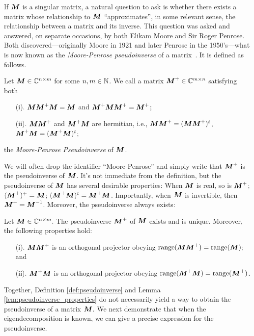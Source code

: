 If ${\vb*{M}}$ is a singular matrix, a natural question to ask is whether there exists a matrix whose relationship to ${\vb*{M}}$ ``approximates'', in some relevant sense, the relationship between a matrix and its inverse. This question  was asked and answered, on separate occasions, by both Elikam Moore and Sir Roger Penrose. Both discovered---originally Moore in 1921 and later Penrose in the 1950's---what is now known as the \emph{Moore-Penrose pseudoinverse} of a matrix~\cite{moore1920reciprocal, penrose1955generalized,penrose1956best}. It is defined as follows. 

\begin{definition}
\label{def:pseudoinverse}
Let ${\vb*{M}}\in\mathbb{C}^{n\times m}$ for some $n,m\in\mathbb{N}$. We call a matrix ${\vb*{M}}^+\in\mathbb{C}^{m\times n}$ satisfying both
\begin{enumerate}
    \item[(i).] ${\vb*{M}}{\vb*{M}}^+{\vb*{M}}={\vb*{M}}$ and ${\vb*{M}}^+{\vb*{M}}{\vb*{M}}^+={\vb*{M}}^+$;
    \item[(ii).] ${\vb*{M}}{\vb*{M}}^+$ and ${\vb*{M}}^+{\vb*{M}}$ are hermitian, i.e., ${\vb*{M}}{\vb*{M}}^+=({\vb*{M}}{\vb*{M}}^+)^t $, ${\vb*{M}}^+{\vb*{M}}=({\vb*{M}}^+{\vb*{M}})^t$; 
\end{enumerate}
the \emph{Moore-Penrose Pseudoinverse} of ${\vb*{M}}$. 
\end{definition}

We will often drop the identifier ``Moore-Penrose'' and simply write that ${\vb*{M}}^+$ is the pseudoinverse of ${\vb*{M}}$. It's not immediate from  the definition, but the pseudoinverse of ${\vb*{M}}$ has several desirable properties: When ${\vb*{M}}$ is real, so is ${\vb*{M}}^+$; $({\vb*{M}}^+)^+={\vb*{M}}$; $({\vb*{M}}^+{\vb*{M}})^t = {\vb*{M}}^+{\vb*{M}}$. Importantly, when ${\vb*{M}}$ is invertible, then ${\vb*{M}}^+={\vb*{M}}^{-1}$. Moreover, the pseudoinverse always exists: 

\begin{lemma}
	\label{lem:pseudoinverse_properties}
Let ${\vb*{M}}\in \mathbb{C}^{n\times m}$. The pseudoinverse  ${\vb*{M}}^+$ of ${\vb*{M}}$ exists and is unique. Moreover, the following properties hold: 
\begin{enumerate}
    \item[(i).] ${\vb*{M}}{\vb*{M}}^+$ is an orthogonal projector obeying $\textnormal{range}({\vb*{M}}{\vb*{M}}^+)=\textnormal{range}({\vb*{M}})$; and 
    \item[(ii).] ${\vb*{M}}^+{\vb*{M}}$ is an orthogonal projector obeying $\textnormal{range}({\vb*{M}}^+{\vb*{M}})=\textnormal{range}({\vb*{M}}^+)$. 
\end{enumerate}
\end{lemma}

Together, Definition \ref{def:pseudoinverse} and Lemma \ref{lem:pseudoinverse_properties} do not necessarily yield a way to obtain the pseudoinverse of a matrix ${\vb*{M}}$. We  next demonstrate that when the eigendecomposition is known, we  can give a precise expression for the pseudoinverse. 

